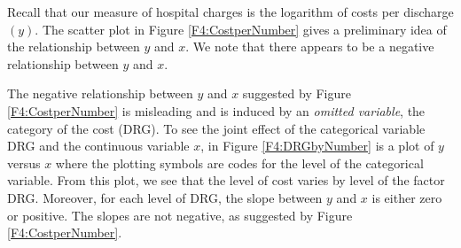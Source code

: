 Recall that our measure of hospital charges is the logarithm of
costs per discharge $(y)$. The scatter plot in Figure
\ref{F4:CostperNumber} gives a preliminary idea of the relationship
between $y$ and $x$. We note that there appears to be a negative
relationship between $y$ and $x$.

The negative relationship between $y$ and $x$ suggested by Figure
\ref{F4:CostperNumber} is misleading and is induced by an
\textit{omitted variable}, the category of the cost (DRG). To see
the joint effect of the categorical variable DRG and the continuous
variable $x$, in Figure \ref{F4:DRGbyNumber} is a plot of $y$ versus
$x$ where the plotting symbols are codes for the level of the
categorical variable. From this plot, we see that the level of cost
varies by level of the factor DRG. Moreover, for each level of DRG,
the slope between $y$ and $x$ is either zero or positive. The slopes
are not negative, as suggested by Figure \ref{F4:CostperNumber}.


